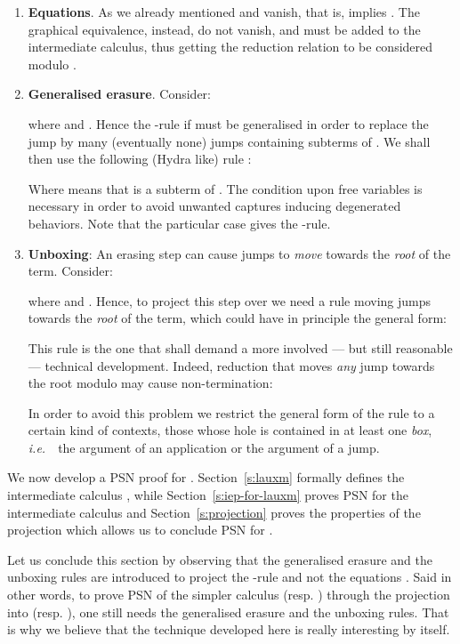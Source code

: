 \documentclass{LMCS}
\newcommand{\ie}{{\it  i.e.}~}
\renewcommand{\>}{\rightarrow}
\newcommand{\deft}[1]{{\bf #1}}
\begin{document}
\begin{enumerate}[(1)]
\item 
\deft{Equations}. 
As we already mentioned  and 
vanish, that is, 
 implies
. The graphical equivalence, instead,
do not vanish, and must be added to the intermediate calculus, thus 
getting  the reduction  relation to be considered modulo .


  \item \deft{Generalised erasure}. Consider:

where  and . 
Hence the -rule  if 
must be generalised in order to replace
the jump  by many (eventually none) jumps containing subterms of .  We shall
then use the following (Hydra like) rule :
 
Where  means that  is a subterm of . The condition upon
free variables is necessary in order to avoid unwanted captures
inducing degenerated behaviors. Note that the particular case  gives
the -rule.
\item \deft{Unboxing}: An erasing step
 can cause jumps
to \textit{move} towards the \textit{root} of the term. Consider:

where  and .  
Hence, to project this step over  we need a rule moving
jumps towards the \textit{root} of the term, which could have in
principle the general form:
 
This rule is the one that shall demand a more involved --- but
still reasonable --- technical development. Indeed, 
reduction that moves  \textit{any} jump towards the root  modulo   may cause non-termination:
 
In order to avoid this problem we
restrict the general form of the rule to a certain kind of contexts, those
whose hole is contained in at least one \textit{box}, \ie\  
the argument of an application or the argument of a
jump. \medskip
\end{enumerate}

\noindent We now develop a PSN proof for . 
Section~\ref{s:lauxm}  formally defines the intermediate calculus
, 
while Section~\ref{s:iep-for-lauxm} proves PSN
for the intermediate calculus   and
Section~\ref{s:projection} proves the properties of the projection which allows us to conclude PSN for . 

Let us conclude this section by observing that the 
  generalised erasure and the unboxing rules are 
introduced to project the -rule and not the 
equations 
. Said in other words, 
to prove PSN of the simpler calculus  (resp. ) through the 
  projection into  (resp. ), one still needs the generalised erasure and the unboxing rules. That is why we
  believe that the technique  developed here is really interesting by itself.
\end{document}
